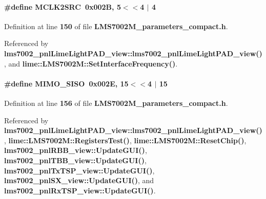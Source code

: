 \paragraph[{M\+C\+L\+K2\+S\+RC}]{\setlength{\rightskip}{0pt plus 5cm}\#define M\+C\+L\+K2\+S\+RC~0x002\+B, 5$<$$<$4 $\vert$  4}\label{LMS7002M__parameters__compact_8h_afaea289307f3201abec63784b986a27b}


Definition at line {\bf 150} of file {\bf L\+M\+S7002\+M\+\_\+parameters\+\_\+compact.\+h}.



Referenced by {\bf lms7002\+\_\+pnl\+Lime\+Light\+P\+A\+D\+\_\+view\+::lms7002\+\_\+pnl\+Lime\+Light\+P\+A\+D\+\_\+view()}, and {\bf lime\+::\+L\+M\+S7002\+M\+::\+Set\+Interface\+Frequency()}.

\paragraph[{M\+I\+M\+O\+\_\+\+S\+I\+SO}]{\setlength{\rightskip}{0pt plus 5cm}\#define M\+I\+M\+O\+\_\+\+S\+I\+SO~0x002\+E, 15$<$$<$4 $\vert$  15}\label{LMS7002M__parameters__compact_8h_a26b51e0582d35b4d1dca1f2dcab13467}


Definition at line {\bf 156} of file {\bf L\+M\+S7002\+M\+\_\+parameters\+\_\+compact.\+h}.



Referenced by {\bf lms7002\+\_\+pnl\+Lime\+Light\+P\+A\+D\+\_\+view\+::lms7002\+\_\+pnl\+Lime\+Light\+P\+A\+D\+\_\+view()}, {\bf lime\+::\+L\+M\+S7002\+M\+::\+Registers\+Test()}, {\bf lime\+::\+L\+M\+S7002\+M\+::\+Reset\+Chip()}, {\bf lms7002\+\_\+pnl\+R\+B\+B\+\_\+view\+::\+Update\+G\+U\+I()}, {\bf lms7002\+\_\+pnl\+T\+B\+B\+\_\+view\+::\+Update\+G\+U\+I()}, {\bf lms7002\+\_\+pnl\+Tx\+T\+S\+P\+\_\+view\+::\+Update\+G\+U\+I()}, {\bf lms7002\+\_\+pnl\+S\+X\+\_\+view\+::\+Update\+G\+U\+I()}, and {\bf lms7002\+\_\+pnl\+Rx\+T\+S\+P\+\_\+view\+::\+Update\+G\+U\+I()}.

